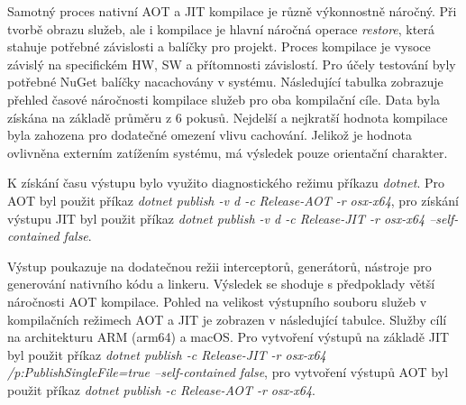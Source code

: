 Samotný proces nativní AOT a JIT kompilace je různě výkonnostně náročný. Při tvorbě obrazu služeb, ale i kompilace je hlavní náročná operace \emph{restore}, která stahuje potřebné závislosti a balíčky pro projekt. Proces kompilace je vysoce závislý na specifickém HW, SW a přítomnosti závislostí. Pro účely testování byly potřebné NuGet balíčky nacachovány v systému. Následující tabulka zobrazuje přehled časové náročnosti kompilace služeb pro oba kompilační cíle. Data byla získána na základě průměru z 6 pokusů. Nejdelší a nejkratší hodnota kompilace byla zahozena pro dodatečné omezení vlivu cachování. Jelikož je hodnota ovlivněna externím zatížením systému, má výsledek pouze orientační charakter.

K získání času výstupu bylo využito diagnostického režimu příkazu \emph{dotnet}. Pro AOT byl použit příkaz \emph{dotnet publish -v d -c Release-AOT -r osx-x64}, pro získání výstupu JIT byl použit příkaz \emph{dotnet publish -v d -c Release-JIT -r osx-x64 --self-contained false}.


Výstup poukazuje na dodatečnou režii interceptorů, generátorů, nástroje pro generování nativního kódu a linkeru. Výsledek se shoduje s předpoklady větší náročnosti AOT kompilace. Pohled na velikost výstupního souboru služeb v kompilačních režimech AOT a JIT je zobrazen v následující tabulce. Služby cílí na architekturu ARM (arm64) a macOS. Pro vytvoření výstupů na základě JIT byl použit příkaz \emph{dotnet publish -c Release-JIT -r osx-x64 /p:PublishSingleFile=true --self-contained false}, pro vytvoření výstupů AOT byl použit příkaz \emph{dotnet publish -c Release-AOT -r osx-x64}.


